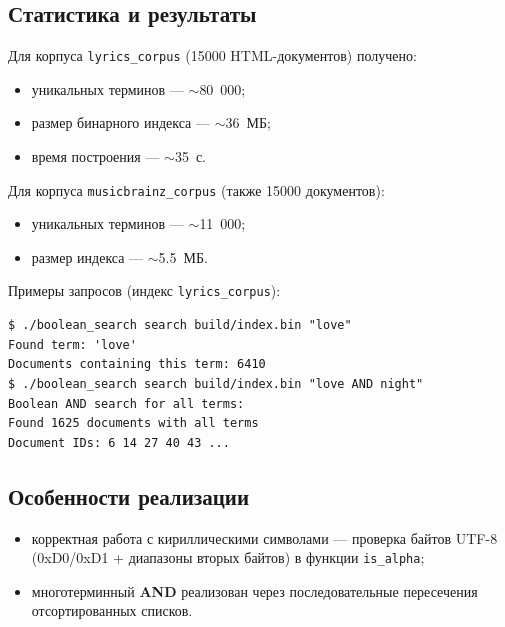 \subsection{Статистика и результаты}
Для корпуса \texttt{lyrics\_corpus} (15000 HTML-документов) получено:
\begin{itemize}
    \item уникальных терминов --- $\sim$80~000;
    \item размер бинарного индекса --- $\sim$36~МБ;
    \item время построения --- $\sim$35~с.
\end{itemize}
Для корпуса \texttt{musicbrainz\_corpus} (также 15000 документов):
\begin{itemize}
    \item уникальных терминов --- $\sim$11~000;
    \item размер индекса --- $\sim$5.5~МБ.
\end{itemize}
Примеры запросов (индекс \texttt{lyrics\_corpus}):
\begin{verbatim}
$ ./boolean_search search build/index.bin "love"
Found term: 'love'
Documents containing this term: 6410
$ ./boolean_search search build/index.bin "love AND night"
Boolean AND search for all terms:
Found 1625 documents with all terms
Document IDs: 6 14 27 40 43 ...
\end{verbatim}

\subsection{Особенности реализации}
\begin{itemize}
    \item корректная работа с кириллическими символами --- проверка байтов UTF-8 (0xD0/0xD1 + диапазоны вторых байтов) в функции \texttt{is\_alpha};
    \item многотерминный \textbf{AND} реализован через последовательные пересечения отсортированных списков.
\end{itemize}
